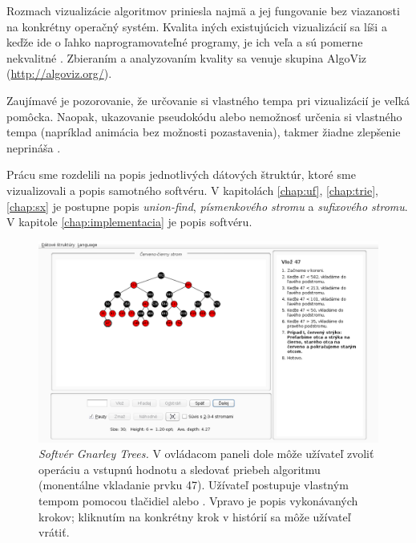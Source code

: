 Rozmach vizualizácie algoritmov priniesla najmä \Java a jej fungovanie 
bez viazanosti na konkrétny operačný systém. Kvalita iných existujúcich 
vizualizácií sa líši a keďže ide o ľahko naprogramovateľné programy, je ich 
veľa a sú pomerne nekvalitné \citep{shaffer}. 
Zbieraním a analyzovaním kvality sa venuje skupina AlgoViz (\hbox{\url{http://algoviz.org/}}).

Zaujímavé je pozorovanie, že určovanie si vlastného tempa pri vizualizácií 
je veľká pomôcka. Naopak, ukazovanie pseudokódu alebo nemožnosť určenia si
vlastného tempa (napríklad animácia bez možnosti pozastavenia), takmer 
žiadne zlepšenie neprináša \citep{shaffer,saraiya}.


Prácu sme rozdelili na popis jednotlivých dátových štruktúr, ktoré sme 
vizualizovali a popis samotného softvéru. V kapitolách 
\ref{chap:uf}, \ref{chap:trie}, \ref{chap:sx} je postupne popis \emph{union-find}, 
\emph{písmenkového stromu} a \emph{sufixového stromu}. V kapitole 
\ref{chap:implementacia} je popis softvéru.
 
\begin{figure}
\centering
\includegraphics[width=\columnwidth]{obrazky/gt.png}
\caption{\emph{Softvér Gnarley Trees.} V ovládacom paneli dole môže užívateľ
zvoliť operáciu a vstupnú hodnotu a sledovať priebeh algoritmu (monentálne vkladanie
prvku 47). Užívateľ postupuje vlastným tempom  pomocou tlačidiel  alebo
. Vpravo je popis vykonávaných krokov; kliknutím na konkrétny krok v histórií
sa môže užívateľ vrátiť.}
\label{img:historia} 
\end{figure}
